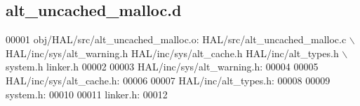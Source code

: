 \subsection{alt\+\_\+uncached\+\_\+malloc.\+d}
\label{alt__uncached__malloc_8d_source}

\begin{DoxyCode}
00001 obj/HAL/src/alt_uncached_malloc.o: HAL/src/alt_uncached_malloc.c \(\backslash\)
 HAL/inc/sys/alt\_warning.h HAL/inc/sys/alt\_cache.h HAL/inc/alt\_types.h \(\backslash\)
 system.h linker.h
00002 
00003 HAL/inc/sys/alt\_warning.h:
00004 
00005 HAL/inc/sys/alt\_cache.h:
00006 
00007 HAL/inc/alt\_types.h:
00008 
00009 system.h:
00010 
00011 linker.h:
00012 \end{DoxyCode}
